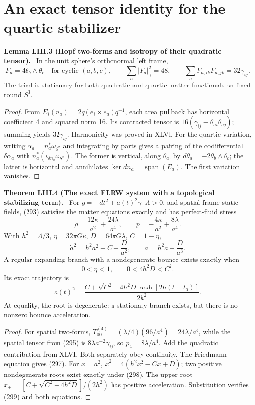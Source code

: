 \documentclass[11pt,a4paper,oneside]{book}
\newcommand{\statement}[3]{\par\medskip\noindent\textbf{#1 #2 (#3).}\ }
\begin{document}
\section{An exact tensor identity for the quartic stabilizer}
\statement{Lemma}{LIII.3}{Hopf two-forms and isotropy of their quadratic tensor}
In the unit sphere's orthonormal left frame,
\begin{equation}F_a=4\theta_b\wedge\theta_c\quad\text{for cyclic }(a,b,c),\qquad\sum_a|F_a|_\gamma^2=48,\qquad\sum_aF_{a,ik}F_{a,jk}=32\gamma_{ij}.\tag{295}\end{equation}
The triad is stationary for both quadratic and quartic matter functionals on fixed round $S^3$.
\begin{proof}
From $E_i(n_a)=2q(e_i\times e_a)q^{-1}$, each area pullback has horizontal coefficient 4 and squared norm 16. Its contracted tensor is $16(\gamma_{ij}-\theta_{ai}\theta_{aj})$; summing yields $32\gamma_{ij}$. Harmonicity was proved in XLVI. For the quartic variation, writing $\alpha_a=n_a^*\omega_{S^2}$ and integrating by parts gives a pairing of the codifferential $\delta\alpha_a$ with $n_a^*(\iota_{\delta n_a}\omega_{S^2})$. The former is vertical, along $\theta_a$, by $d\theta_a=-2\theta_b\wedge\theta_c$; the latter is horizontal and annihilates $\ker dn_a=\operatorname{span}(E_a)$. The first variation vanishes.
\end{proof}
\statement{Theorem}{LIII.4}{The exact FLRW system with a topological stabilizing term}
For $g=-dt^2+a(t)^2\gamma$, $\Lambda>0$, and spatial-frame-static fields, (293) satisfies the matter equations exactly and has perfect-fluid stress
\begin{equation}\rho=\frac{12\kappa}{a^2}+\frac{24\lambda}{a^4},\qquad p=-\frac{4\kappa}{a^2}+\frac{8\lambda}{a^4}.\tag{296}\end{equation}
With $h^2=\Lambda/3$, $\eta=32\pi G\kappa$, $D=64\pi G\lambda$, $C=1-\eta$,
\begin{equation}\dot a^2=h^2a^2-C+\frac D{a^2},\qquad\ddot a=h^2a-\frac D{a^3}.\tag{297}\end{equation}
A regular expanding branch with a nondegenerate bounce exists exactly when
\begin{equation}0<\eta<1,\qquad0<4h^2D<C^2.\tag{298}\end{equation}
Its exact trajectory is
\begin{equation}a(t)^2=\frac{C+\sqrt{C^2-4h^2D}\cosh[2h(t-t_0)]}{2h^2}.\tag{299}\end{equation}
At equality, the root is degenerate: a stationary branch exists, but there is no nonzero bounce acceleration.
\begin{proof}
For spatial two-forms, $T^{(4)}_{00}=(\lambda/4)(96/a^4)=24\lambda/a^4$, while the spatial tensor from (295) is $8\lambda a^{-2}\gamma_{ij}$, so $p_4=8\lambda/a^4$. Add the quadratic contribution from XLVI. Both separately obey continuity. The Friedmann equation gives (297). For $x=a^2$, $\dot x^2=4(h^2x^2-Cx+D)$; two positive nondegenerate roots exist exactly under (298). The upper root $x_+=[C+\sqrt{C^2-4h^2D}]/(2h^2)$ has positive acceleration. Substitution verifies (299) and both equations.
\end{proof}
\end{document}
